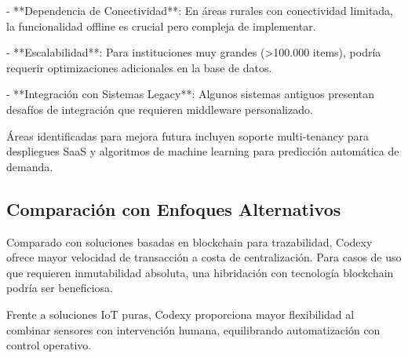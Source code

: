 - **Dependencia de Conectividad**: En áreas rurales con conectividad limitada, la funcionalidad offline es crucial pero compleja de implementar.

- **Escalabilidad**: Para instituciones muy grandes (>100.000 items), podría requerir optimizaciones adicionales en la base de datos.

- **Integración con Sistemas Legacy**: Algunos sistemas antiguos presentan desafíos de integración que requieren middleware personalizado.

Áreas identificadas para mejora futura incluyen soporte multi-tenancy para despliegues SaaS y algoritmos de machine learning para predicción automática de demanda.

\subsection{Comparación con Enfoques Alternativos}

Comparado con soluciones basadas en blockchain para trazabilidad, Codexy ofrece mayor velocidad de transacción a costa de centralización. Para casos de uso que requieren inmutabilidad absoluta, una hibridación con tecnología blockchain podría ser beneficiosa.

Frente a soluciones IoT puras, Codexy proporciona mayor flexibilidad al combinar sensores con intervención humana, equilibrando automatización con control operativo.